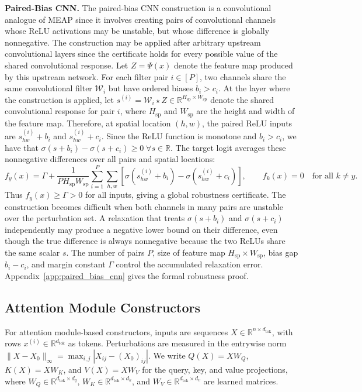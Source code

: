 \documentclass{article}
\theoremstyle{definition}
\begin{document}
\textbf{Paired-Bias CNN.} 
The paired-bias CNN construction is a convolutional analogue of MEAP since it involves creating pairs of convolutional channels whose ReLU activations may be unstable, but whose difference is globally nonnegative. The construction may be applied after arbitrary upstream convolutional layers since the certificate holds for every possible value of the shared convolutional response. Let $Z=\Psi(x)$ denote the feature map produced by this upstream network. For each filter pair $i\in[P]$, two channels share the same convolutional filter $\mathcal{W}_i$ but have ordered biases $b_i>c_i$. 
At the layer where the construction is applied, let $s^{(i)}=\mathcal W_i\star Z\in\mathbb R^{H_{\mathrm{sp}}\times W_{\mathrm{sp}}}$ denote the shared convolutional response for pair $i$, where $H_{\mathrm{sp}}$ and $W_{\mathrm{sp}}$ are the height and width of the feature map. Therefore, at spatial location $(h,w)$, the paired ReLU inputs are $s_{hw}^{(i)}+b_i$ and $s_{hw}^{(i)}+c_i$. 
Since the ReLU function is monotone and $b_i>c_i$, we have that $\sigma(s+b_i)-\sigma(s+c_i)\geq 0 \; \forall s\in\mathbb R$.
The target logit averages these nonnegative differences over all pairs and spatial locations: 
\begin{equation}
    f_y(x)=\Gamma+\frac{1}{PH_{\mathrm{sp}}W_{\mathrm{sp}}}\sum_{i=1}^P\sum_{h,w}
    \left[ \sigma(s_{hw}^{(i)}+b_i)-\sigma(s_{hw}^{(i)}+c_i) \right],
    \qquad
    f_k(x)=0\quad \text{for all }k\neq y.
    \label{eq:paired_bias_logit}
\end{equation}
Thus $f_y(x)\geq \Gamma>0$ for all inputs, giving a global robustness certificate. The construction becomes difficult when both channels in many pairs are unstable over the perturbation set. A relaxation that treats $\sigma(s+b_i)$ and $\sigma(s+c_i)$ independently may produce a negative lower bound on their difference, even though the true difference is always nonnegative because the two ReLUs share the same scalar $s$. The number of pairs $P$, size of feature map $H_{\mathrm{sp}}\times W_{\mathrm{sp}}$, bias gap $b_i-c_i$, and margin constant $\Gamma$ control the accumulated relaxation error. Appendix~\ref{app:paired_bias_cnn} gives the formal robustness proof. 

\subsection{Attention Module Constructors} 

For attention module-based constructors, inputs are sequences $X\in\mathbb R^{n\times d_{\mathrm{tok}}}$, 
with rows $x^{(i)}\in\mathbb R^{d_{\mathrm{tok}}}$ %
as tokens. 
Perturbations are measured in the entrywise norm $\|X-X_0\|_\infty=\max_{i,j}|X_{ij}-(X_0)_{ij}|$. We write $Q(X)=XW_Q$, $K(X)=XW_K$, and $V(X)=XW_V$ for the query, key, and value projections, where $W_Q\in\mathbb R^{d_{\mathrm{tok}}\times d_q}$, $W_K\in\mathbb R^{d_{\mathrm{tok}}\times d_k}$, and $W_V\in\mathbb R^{d_{\mathrm{tok}}\times d_v}$ are learned matrices.
\end{document}
